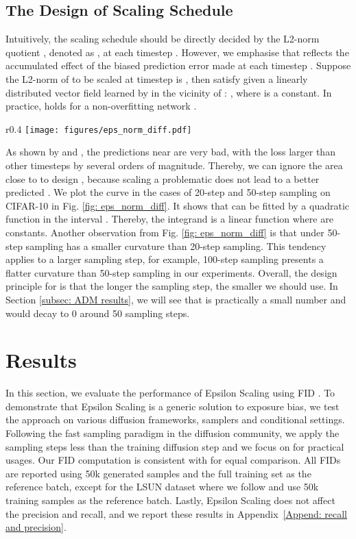 \documentclass{article} \usepackage{iclr2024_conference,times}
\begin{document}
\subsection{The Design of Scaling Schedule}
Intuitively, the scaling schedule  should be directly decided by the L2-norm quotient , denoted as , at each timestep . However, we emphasise that  reflects the accumulated effect of the biased prediction error made at each timestep . Suppose the L2-norm of  to be scaled at timestep  is , then  satisfy  given a linearly distributed vector field learned by  in the vicinity of : , where  is a constant. In practice,  holds for a non-overfitting network . 

\begin{wrapfigure}{r}{0.4\textwidth}
\vskip -0.2in
  \texttt{[image: figures/eps\_norm\_diff.pdf]}
  \captionsetup{skip=2pt}  \caption{ at each timestep.}
\label{fig: eps_norm_diff}
\vskip -0.1in
\end{wrapfigure}

As shown by \citet{IDDPM} and \citet{benny2022dynamic}, the  predictions near  are very bad, with the loss larger than other timesteps by several orders of magnitude. Thereby, we can ignore the area close to  to design , because scaling a problematic  does not lead to a better predicted . We plot the  curve in the cases of 20-step and 50-step sampling on CIFAR-10 in Fig. \ref{fig: eps_norm_diff}. It shows that  can be fitted by a quadratic function in the interval . Thereby, the integrand  is a linear function  where  are constants. Another observation from Fig. \ref{fig: eps_norm_diff} is that  under 50-step sampling has a smaller curvature than 20-step sampling. This tendency applies to a larger sampling step, for example, 100-step sampling presents a flatter curvature than 50-step sampling in our experiments. Overall, the design principle for  is that the longer the sampling step, the smaller  we should use. In Section \ref{subsec: ADM results}, we will see that  is practically a small number and would decay to 0 around 50 sampling steps.



\section{Results}
\label{sec: results}
In this section, we evaluate the performance of Epsilon Scaling using FID \citep{FID}. To demonstrate that Epsilon Scaling is a generic solution to exposure bias, we test the approach on various diffusion frameworks, samplers and conditional settings. Following the fast sampling paradigm \citep{karras2022elucidating} in the diffusion community, we apply the sampling steps  less than the training diffusion step  and we focus on  for practical usages. Our FID computation is consistent with
\citep{ADM} for equal comparison. All FIDs are reported using 50k generated samples and the full training set as the reference batch, except for the LSUN dataset where we follow \citep{ADM} and use 50k training samples as the reference batch. Lastly, Epsilon Scaling does not affect the precision and recall, and we report these results in Appendix~\ref{Append: recall and precision}.
\end{document}
